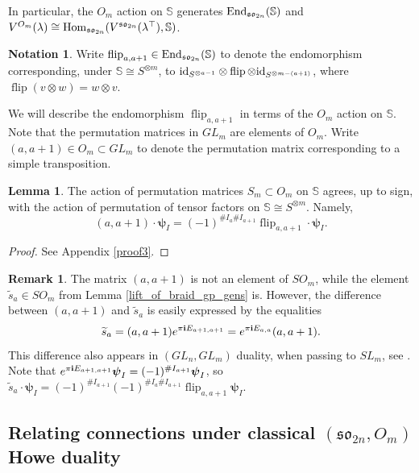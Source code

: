 \documentclass[10pt]{amsart}
\numberwithin{equation}{section}
\theoremstyle{definition}
\newtheorem{lemma}[theorem]{Lemma}
\newtheorem{remark}[theorem]{Remark}
\newtheorem{notation}[theorem]{Notation}
\newcommand{\Hom}{{\rm Hom}}
\newcommand{\End}{{\rm End}}
\newcommand{\id}{{\rm id}}
\let\tilde=\widetilde
\newcommand{\son}[1][2n]{\mathfrak{so}_{#1}}
\newcommand{\flip}{\operatorname{flip}}
\newcommand{\hwp}{\boldsymbol{\psi}}
\newcommand{\howespin}{\boldsymbol{\mathbb{S}}}
\begin{document}
In particular, the $O_m$ action on $\howespin$ generates $\End_{\son}(\howespin)$ and $V^{O_m}(\lambda)\cong \Hom_{\son}(V^{\son}(\lambda^{\top}), \howespin)$.

\begin{notation}
    Write $\flip_{a,a+1}\in \End_{\son}(\howespin)$ to denote the endomorphism corresponding, under $\howespin\cong S^{\otimes m}$, to $\id_{S^{\otimes a-1}}\otimes \flip \otimes \id_{S^{\otimes m-(a+1)}}$, where $\flip(v\otimes w) = w\otimes v$. 
\end{notation}

We will describe the endomorphism $\flip_{a,a+1}$ in terms of the $O_m$ action on $\howespin$. Note that the permutation matrices in $GL_m$ are elements of $O_m$. Write $(a,a+1)\in O_m\subset GL_m$ to denote the permutation matrix corresponding to a simple transposition.

\begin{lemma}\label{lem:signforaap1}
    The action of permutation matrices $ S_m\subset O_m$ on $\howespin$ agrees, up to sign, with the action of permutation of tensor factors on $\howespin\cong S^{\otimes m}$. Namely, 
    \[
    (a,a+1)\cdot \hwp_I=(-1)^{\#I_a\#I_{a+1}}\flip_{a,a+1}\cdot\hwp_I.
    \]
\end{lemma}

\begin{proof}
   See Appendix \ref{proof3}.
\end{proof}

\begin{remark}\label{rem:stilde(1,2)}
    The matrix $(a,a+1)$ is not an element of $SO_m$, while the element $\tilde{s}_a\in SO_m$ from Lemma \ref{lift_of_braid_gp_gens} is. However, the difference between $(a,a+1)$ and $\tilde{s}_a$ is easily expressed by the equalities 
    \[
    \tilde{s}_a = (a,a+1)e^{\pi{\bf i} E_{a+1,a+1}} =e^{\pi{\bf i} E_{a,a}}(a,a+1).
    \]
    This difference also appears in $(GL_n,GL_m)$ duality, when passing to $SL_m$, see \cite[Corollary 3.6]{Valerio-qWeyl}. Note that $e^{\pi{\bf i} E_{a+1,a+1}}\hwp_I = (-1)^{\# I_{a+1}}\hwp_I$, so $\tilde{s}_a\cdot \hwp_I = (-1)^{\#I_{a+1}}(-1)^{\#I_a\#I_{a+1}}\flip_{a,a+1}\hwp_I$.
\end{remark}

\subsection{Relating connections under classical $(\son, O_m)$ Howe duality}
\end{document}

